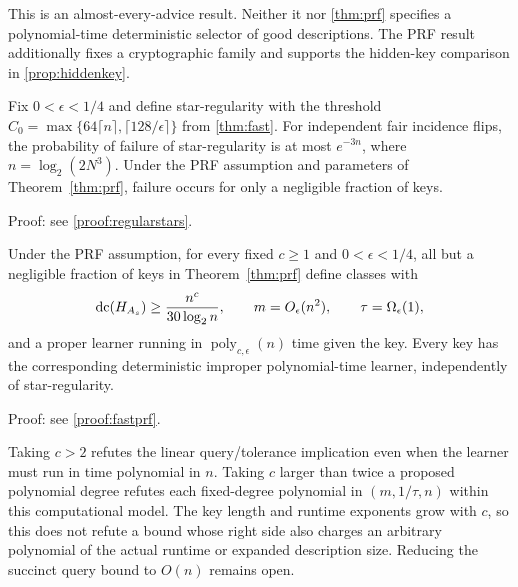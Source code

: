 This is an almost-every-advice result. Neither it nor \cref{thm:prf} specifies a polynomial-time deterministic selector of good descriptions. The PRF result additionally fixes a cryptographic family and supports the hidden-key comparison in \cref{prop:hiddenkey}.

\begin{lemma}\label{lem:regularstars}
Fix $0<\epsilon<1/4$ and define star-regularity with the threshold $C_0=\max\{64\lceil n\rceil,\lceil128/\epsilon\rceil\}$ from \cref{thm:fast}. For independent fair incidence flips, the probability of failure of star-regularity is at most $e^{-3n}$, where $n=\log_2(2N^3)$. Under the PRF assumption and parameters of Theorem~\ref{thm:prf}, failure occurs for only a negligible fraction of keys.
\end{lemma}

\noindent Proof: see \cref{proof:regularstars}.\par



\begin{corollary}\label{cor:fastprf}
Under the PRF assumption, for every fixed $c\ge1$ and $0<\epsilon<1/4$, all but a negligible fraction of keys in Theorem~\ref{thm:prf} define classes with
\[
 \operatorname{dc}(H_{A_s})\ge\frac{n^c}{30\log_2n},\qquad
 m=O_\epsilon(n^2),\qquad\tau=\Omega_\epsilon(1),
\]
and a proper learner running in $\operatorname{poly}_{c,\epsilon}(n)$ time given the key. Every key has the corresponding deterministic improper polynomial-time learner, independently of star-regularity.
\end{corollary}

\noindent Proof: see \cref{proof:fastprf}.\par


Taking $c>2$ refutes the linear query/tolerance implication even when the learner must run in time polynomial in $n$. Taking $c$ larger than twice a proposed polynomial degree refutes each fixed-degree polynomial in $(m,1/\tau,n)$ within this computational model. The key length and runtime exponents grow with $c$, so this does not refute a bound whose right side also charges an arbitrary polynomial of the actual runtime or expanded description size. Reducing the succinct query bound to $O(n)$ remains open.

